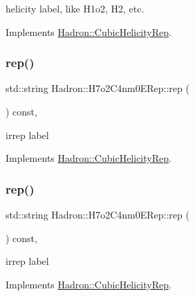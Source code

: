 helicity label, like H1o2, H2, etc. 

Implements \mbox{\hyperlink{structHadron_1_1CubicHelicityRep_af1096946b7470edf0a55451cc662f231}{Hadron\+::\+Cubic\+Helicity\+Rep}}.

\mbox{\label{structHadron_1_1H7o2C4nm0ERep_a60af54c0200a7bd60fc3f4346116cc34}} 
\subsubsection{\texorpdfstring{rep()}{rep()}\hspace{0.1cm}{\footnotesize\ttfamily [1/2]}}
{\footnotesize\ttfamily std\+::string Hadron\+::\+H7o2\+C4nm0\+E\+Rep\+::rep (\begin{DoxyParamCaption}{ }\end{DoxyParamCaption}) const\hspace{0.3cm}{\ttfamily [inline]}, {\ttfamily [virtual]}}

irrep label 

Implements \mbox{\hyperlink{structHadron_1_1CubicHelicityRep_a8cdd86f068a167dc96faef02bfb8a33d}{Hadron\+::\+Cubic\+Helicity\+Rep}}.

\mbox{\label{structHadron_1_1H7o2C4nm0ERep_a60af54c0200a7bd60fc3f4346116cc34}} 
\subsubsection{\texorpdfstring{rep()}{rep()}\hspace{0.1cm}{\footnotesize\ttfamily [2/2]}}
{\footnotesize\ttfamily std\+::string Hadron\+::\+H7o2\+C4nm0\+E\+Rep\+::rep (\begin{DoxyParamCaption}{ }\end{DoxyParamCaption}) const\hspace{0.3cm}{\ttfamily [inline]}, {\ttfamily [virtual]}}

irrep label 

Implements \mbox{\hyperlink{structHadron_1_1CubicHelicityRep_a8cdd86f068a167dc96faef02bfb8a33d}{Hadron\+::\+Cubic\+Helicity\+Rep}}.

\mbox{\label{structHadron_1_1H7o2C4nm0ERep_aa823f506650bea0e0e2f79894f6f8360}} 
